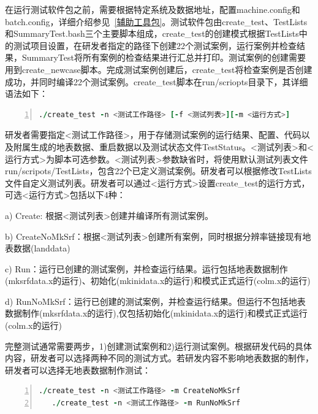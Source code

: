 在运行测试软件包之前，需要根据特定系统及数据地址，配置machine.config和batch.config，详细介绍参见~\ref{辅助工具包}。测试软件包由create\_test、TestLists和SummaryTest.bash三个主要脚本组成，create\_test的创建模式根据TestLists中的测试项目设置，在研发者指定的路径下创建22个测试案例，运行案例并检查结果，SummaryTest将所有案例的检查结果进行汇总并打印。测试案例的创建需要用到create\_newcase脚本。完成测试案例创建后，create\_test将检查案例是否创建成功，并同时编译22个测试案例。create\_test脚本在run/scriopts目录下，其详细语法如下：

\begin{lstlisting}[language=fortran, basicstyle=\linespread{1.0}\footnotesize\ttfamily, commentstyle=\color{olive}, numbers=left, numberstyle=\tiny, xleftmargin=1.5em,xrightmargin=0em, aboveskip=1em]
   ./create_test -n <测试工作路径> [-f <测试列表>][-m <运行方式>]
\end{lstlisting}

研发者需要指定<测试工作路径>，用于存储测试案例的运行结果、配置、代码以及附属生成的地表数据、重启数据以及测试状态文件TestStatus。<测试列表>和<运行方式>为脚本可选参数。<测试列表>参数缺省时，将使用默认测试列表文件run/scripots/TestLists，包含22个已定义测试案例。研发者可以根据修改TestLists文件自定义测试列表。研发者可以通过<运行方式>设置create\_test的运行方式，可选<运行方式>包括以下4种：

a) Create: 根据<测试列表>创建并编译所有测试案例。

b) CreateNoMkSrf：根据<测试列表>创建所有案例，同时根据分辨率链接现有地表数据(landdata)

c) Run：运行已创建的测试案例，并检查运行结果。运行包括地表数据制作(mksrfdata.x的运行)、初始化(mkinidata.x的运行)和模式正式运行(colm.x的运行)

d) RunNoMkSrf：运行已创建的测试案例，并检查运行结果。但运行不包括地表数据制作(mksrfdata.x的运行),仅包括初始化(mkinidata.x的运行)和模式正式运行(colm.x的运行)

完整测试通常需要两步，1)创建测试案例和2)运行测试案例。根据研发代码的具体内容，研发者可以选择两种不同的测试方式。若研发内容不影响地表数据的制作，研发者可以选择无地表数据制作测试：

\begin{lstlisting}[language=fortran, basicstyle=\linespread{1.0}\footnotesize\ttfamily, commentstyle=\color{olive}, numbers=left, numberstyle=\tiny, xleftmargin=1.5em,xrightmargin=0em, aboveskip=1em]
   ./create_test -n <测试工作路径> -m CreateNoMkSrf
   ./create_test -n <测试工作路径> -m RunNoMkSrf
\end{lstlisting}

